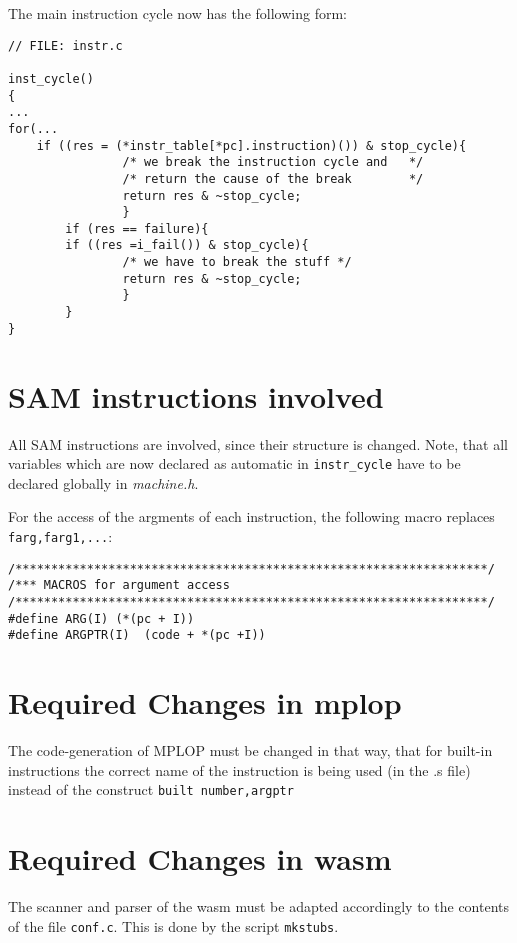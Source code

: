 The main instruction cycle now has the following form:

\begin{verbatim}
// FILE: instr.c

inst_cycle()
{
...
for(...
	if ((res = (*instr_table[*pc].instruction)()) & stop_cycle){
                /* we break the instruction cycle and   */
                /* return the cause of the break        */
                return res & ~stop_cycle;
                }
        if (res == failure){
        if ((res =i_fail()) & stop_cycle){
                /* we have to break the stuff */
                return res & ~stop_cycle;
                }
        }
}
\end{verbatim}

\section{SAM instructions involved}

All SAM instructions are involved, since their structure is changed.
Note, that all variables which are now declared as automatic in
{\tt instr\_cycle} have to be declared globally in {\em machine.h}.

For the access of the argments of each instruction, the following
macro replaces {\tt farg,farg1,...}:

\begin{verbatim}
/******************************************************************/
/*** MACROS for argument access
/******************************************************************/
#define ARG(I) (*(pc + I))
#define ARGPTR(I)  (code + *(pc +I))
\end{verbatim}


\section{Required Changes in mplop}

The code-generation of MPLOP must be changed in that way, that for
built-in instructions the correct name of the instruction is being
used (in the .s file) instead of the construct {\tt built  number,argptr}

\section{Required Changes in wasm}

The scanner and parser of the wasm must be adapted accordingly to
the contents of the file {\tt conf.c}.
This is done by the script {\tt mkstubs}.

